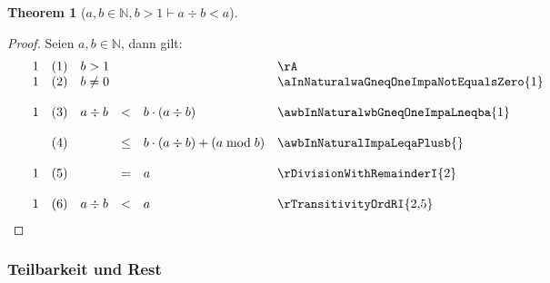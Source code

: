 \documentclass{book}
\theoremstyle{plain}
\newtheorem{theorem}{Theorem}
\theoremstyle{remark}
\theoremstyle{definition}
\begin{document}
\label{awbInNaturalwbGneqOneImpaDivbLneqa}
\begin{theorem}[\(a,b\in\mathbb{N}, b > 1\vdash a\div b<a\)]
\end{theorem}
\begin{proof}
Seien \(a,b\in\mathbb{N}\), dann gilt:
    \[
	\begin{array}{llcll p{4.5cm}}
             1 &  (1)  & \multicolumn{3}{l}{b > 1} & \rA \\
             1 &  (2)  & \multicolumn{3}{l}{b \neq 0} & \aInNaturalwaGneqOneImpaNotEqualsZero{1} \\
             1 &  (3)  & a\div b&<& b\cdot (a\div b) & \awbInNaturalwbGneqOneImpaLneqba{1} \\
               &  (4)  &     &\leq& b\cdot (a\div b)+(a\bmod b) & \awbInNaturalImpaLeqaPlusb{} \\
             1 &  (5)  &     &=& a & \rDivisionWithRemainderI{2} \\
             1 &  (6)  & a\div b &< & a & \rTransitivityOrdRI{2,5} \\
        \end{array}
    \]
\end{proof}

\subsubsection{Teilbarkeit und Rest}
\end{document}
